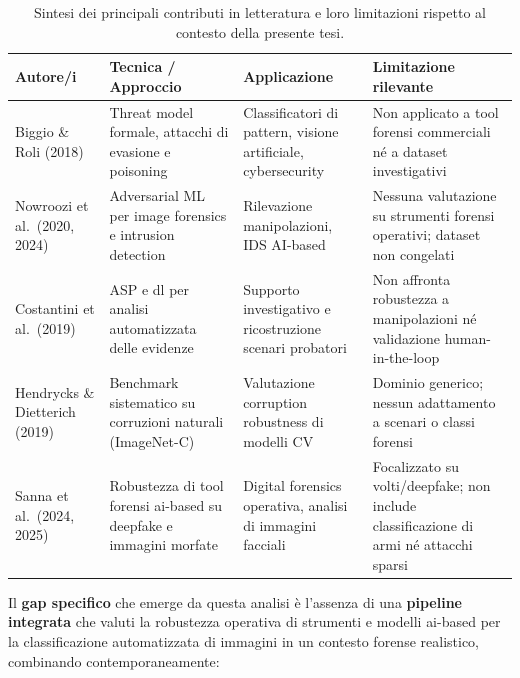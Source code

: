 \begin{table}[H]
\centering
\caption{Sintesi dei principali contributi in letteratura e loro limitazioni rispetto al contesto della presente tesi.}
\label{tab:sota}
\small
\begin{tabular}{|p{3.2cm}|p{3.6cm}|p{3.6cm}|p{4cm}|}
\hline
\textbf{Autore/i} & \textbf{Tecnica / Approccio} & \textbf{Applicazione} & \textbf{Limitazione rilevante} \\
\hline
Biggio \& Roli (2018)~\cite{biggio2018wild}
  & Threat model formale, attacchi di evasione e poisoning
  & Classificatori di pattern, visione artificiale, cybersecurity
  & Non applicato a tool forensi commerciali né a dataset investigativi \\
\hline
Nowroozi et al.\ (2020, 2024)~\cite{nowroozi2020phd, nowroozi2024verifying}
  & Adversarial ML per image forensics e intrusion detection
  & Rilevazione manipolazioni, IDS AI-based
  & Nessuna valutazione su strumenti forensi operativi; dataset non congelati \\
\hline
Costantini et al.\ (2019)~\cite{costantini2019digital}
  & ASP e \gls{dl} per analisi automatizzata delle evidenze
  & Supporto investigativo e ricostruzione scenari probatori
  & Non affronta robustezza a manipolazioni né validazione human-in-the-loop \\
\hline
Hendrycks \& Dietterich (2019)~\cite{hendrycks2019benchmarking}
  & Benchmark sistematico su corruzioni naturali (ImageNet-C)
  & Valutazione corruption robustness di modelli CV
  & Dominio generico; nessun adattamento a scenari o classi forensi \\
\hline
Sanna et al.\ (2024, 2025)~\cite{sanna2024preliminary, sanna2025pixelperfect}
  & Robustezza di tool forensi \gls{ai}-based su deepfake e immagini morfate
  & Digital forensics operativa, analisi di immagini facciali
  & Focalizzato su volti/deepfake; non include classificazione di armi né attacchi sparsi \\
\hline
\end{tabular}
\end{table}

\noindent Il \textbf{gap specifico} che emerge da questa analisi è l'assenza di una \textbf{pipeline integrata} che valuti la robustezza operativa di strumenti e modelli \gls{ai}-based per la classificazione automatizzata di immagini in un contesto forense realistico, combinando contemporaneamente:

